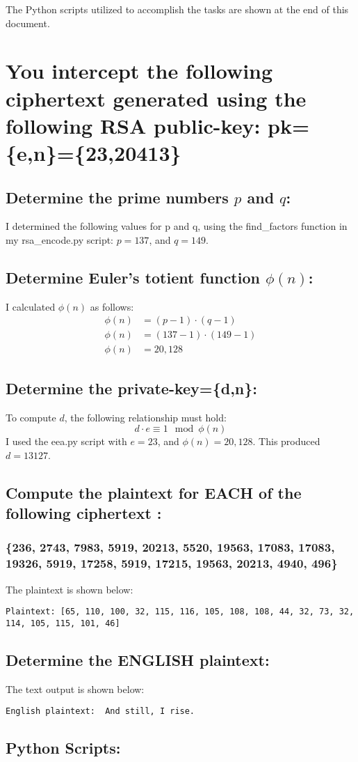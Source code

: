 \documentclass{article}
\begin{document}
The Python scripts utilized to accomplish the tasks are shown at the end of this document.

\section*{You intercept the following ciphertext generated using the following RSA public-key: pk=\{e,n\}=\{23,20413\}}
\subsection*{Determine the prime numbers $p$ and $q$:}

I determined the following values for p and q, using the find\_factors function in my rsa\_encode.py script:
$p = 137$, and $q = 149$.

\subsection*{Determine Euler's totient function $\phi(n)$:}
I calculated $\phi(n)$ as follows:
\begin{align*}
\phi(n) &= (p-1) \cdot (q-1) \\
\phi(n) &= (137 - 1) \cdot (149 - 1) \\
\phi(n) &= 20,128
\end{align*}

\subsection*{Determine the private-key=\{d,n\}:}
To compute $d$, the following relationship must hold:
\begin{equation}
d \cdot e \equiv 1 \mod{\phi(n)} 
\end{equation}
I used the eea.py script with $e=23$, and $\phi(n) = 20,128$.
This produced $d= 13127$.


\subsection*{Compute the plaintext for EACH of the following ciphertext :}
\subsubsection*{\{236, 2743, 7983, 5919, 20213, 5520, 19563, 17083, 17083, 19326, 5919, 17258, 5919, 17215, 19563, 20213, 4940, 496\}}

The plaintext is shown below:
\begin{verbatim}
Plaintext: [65, 110, 100, 32, 115, 116, 105, 108, 108, 44, 32, 73, 32, 114, 105, 115, 101, 46]
\end{verbatim}

\subsection*{Determine the ENGLISH plaintext:}
The text output is shown below:
\begin{verbatim}
English plaintext:  And still, I rise.
\end{verbatim}

\newpage
\subsection*{Python Scripts:}


\newpage

\end{document}

